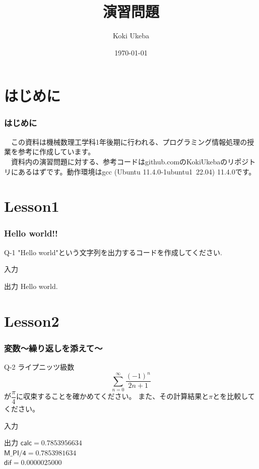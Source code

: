 \documentclass[dvipdfmx]{beamer}
\title{演習問題}
\author{Koki Ukeba}
\date{\today}
\begin{document}
\maketitle
\tableofcontents

\section{はじめに}
\begin{frame}
	\frametitle{はじめに}
	　この資料は機械数理工学科1年後期に行われる、プログラミング情報処理の授業を参考に作成しています。\\
	　資料内の演習問題に対する、参考コードはgithub.comのKokiUkebaのリポジトリにあるはずです。動作環境はgcc (Ubuntu 11.4.0-1ubuntu1~22.04) 11.4.0です。
\end{frame}

\section{Lesson1}
\begin{frame}
	\frametitle{Hello world!!}
	\begin{itembox}[l]{Q-1}
		"Hello world"という文字列を出力するコードを作成してください.
	\end{itembox}
	\begin{block}{入力}
	\end{block}
	\begin{block}{出力}
		Hello world.
	\end{block}
\end{frame}

\section{Lesson2}
\begin{frame}
	\frametitle{変数～繰り返しを添えて～}
	\begin{itembox}[l]{Q-2}
		ライプニッツ級数
		$$\sum_{n=0}^{\infty}\frac{(-1)^n}{2n+1}$$
		が$\dfrac{\pi}{4}$に収束することを確かめてください。
		また、その計算結果と$\pi$とを比較してください。
	\end{itembox}
	\begin{block}{入力}
	\end{block}
	\begin{block}{出力}
		$\mathsf{calc = 0.7853956634}$\\
		$\mathsf{M\_PI/4 = 0.7853981634}$\\
		$\mathsf{dif = 0.0000025000}$
	\end{block}
\end{frame}
\end{document}
